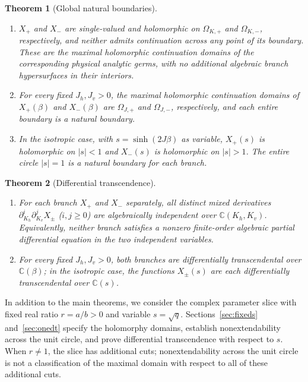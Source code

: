 \documentclass[11pt,a4paper]{article}
\numberwithin{equation}{section}
\theoremstyle{plain}
\newtheorem{theorem}{Theorem}[section]
\theoremstyle{definition}
\begin{document}
\begin{theorem}[Global natural boundaries]\label{thm:mainNB}

\begin{enumerate}
\def\labelenumi{(\roman{enumi})}
\item
  \(X_+\) and \(X_-\) are single-valued and holomorphic on \(\Omega_{K,+}\) and \(\Omega_{K,-}\), respectively, and neither admits continuation across any point of its boundary. These are the maximal holomorphic continuation domains of the corresponding physical analytic germs, with no additional algebraic branch hypersurfaces in their interiors.
\item
  For every fixed \(J_h,J_v>0\), the maximal holomorphic continuation domains of \(X_+(\beta)\) and \(X_-(\beta)\) are \(\Omega_{J,+}\) and \(\Omega_{J,-}\), respectively, and each entire boundary is a natural boundary.
\item
  In the isotropic case, with \(s=\sinh(2J\beta)\) as variable, \(X_+(s)\) is holomorphic on \(|s|<1\) and \(X_-(s)\) is holomorphic on \(|s|>1\). The entire circle \(|s|=1\) is a natural boundary for each branch.
\end{enumerate}

\end{theorem}

\begin{theorem}[Differential transcendence]\label{thm:mainDT}

\begin{enumerate}
\def\labelenumi{(\roman{enumi})}
\item
  For each branch \(X_+\) and \(X_-\) separately, all distinct mixed derivatives \(\partial_{K_h}^i\partial_{K_v}^j X_\pm\) (\(i,j\ge 0\)) are algebraically independent over \(\mathbb C(K_h,K_v)\). Equivalently, neither branch satisfies a nonzero finite-order algebraic partial differential equation in the two independent variables.
\item
  For every fixed \(J_h,J_v>0\), both branches are differentially transcendental over \(\mathbb C(\beta)\); in the isotropic case, the functions \(X_\pm(s)\) are each differentially transcendental over \(\mathbb C(s)\).
\end{enumerate}

\end{theorem}

In addition to the main theorems, we consider the complex parameter slice with fixed real ratio \(r=a/b>0\) and variable \(s=\sqrt q\). Sections~\ref{sec:fixeds} and~\ref{sec:onedt} specify the holomorphy domains, establish nonextendability across the unit circle, and prove differential transcendence with respect to $s$. When \(r\ne 1\), the slice has additional cuts; nonextendability across the unit circle is not a classification of the maximal domain with respect to all of these additional cuts.
\end{document}
